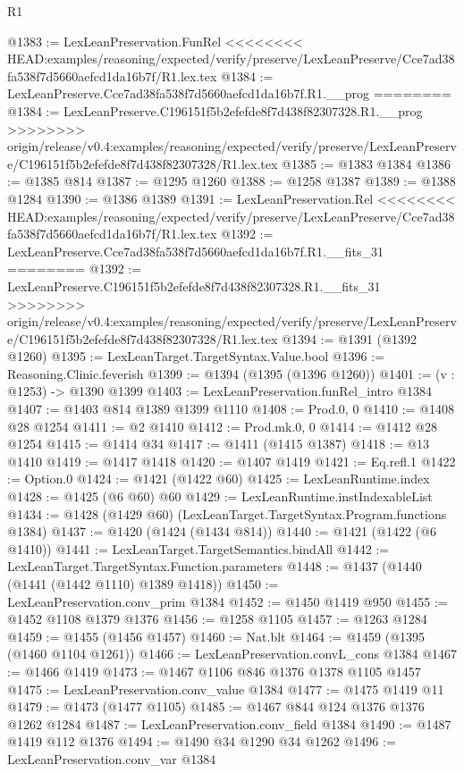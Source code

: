 \begin{lexlean}{R1}
\begin{coremodule}
{{{{{{{{{{{{{{{{{{{{{{{{{{{{{{{{{{{{{{{{{{{{{{{{{{{{{{{{{{{{{{{{{{{{{{{{{{{{{{{{{{{{{{{{{{@1383 := LexLeanPreservation.FunRel
<<<<<<<< HEAD:examples/reasoning/expected/verify/preserve/LexLeanPreserve/Cce7ad38fa538f7d5660aefcd1da16b7f/R1.lex.tex
@1384 := LexLeanPreserve.Cce7ad38fa538f7d5660aefcd1da16b7f.R1.__prog
========
@1384 := LexLeanPreserve.C196151f5b2efefde8f7d438f82307328.R1.__prog
>>>>>>>> origin/release/v0.4:examples/reasoning/expected/verify/preserve/LexLeanPreserve/C196151f5b2efefde8f7d438f82307328/R1.lex.tex
@1385 := @1383 @1384
@1386 := @1385 @814
@1387 := @1295 @1260
@1388 := @1258 @1387
@1389 := @1388 @1284
@1390 := @1386 @1389
@1391 := LexLeanPreservation.Rel
<<<<<<<< HEAD:examples/reasoning/expected/verify/preserve/LexLeanPreserve/Cce7ad38fa538f7d5660aefcd1da16b7f/R1.lex.tex
@1392 := LexLeanPreserve.Cce7ad38fa538f7d5660aefcd1da16b7f.R1.__fits_31
========
@1392 := LexLeanPreserve.C196151f5b2efefde8f7d438f82307328.R1.__fits_31
>>>>>>>> origin/release/v0.4:examples/reasoning/expected/verify/preserve/LexLeanPreserve/C196151f5b2efefde8f7d438f82307328/R1.lex.tex
@1394 := @1391 (@1392 @1260)
@1395 := LexLeanTarget.TargetSyntax.Value.bool
@1396 := Reasoning.Clinic.feverish
@1399 := @1394 (@1395 (@1396 @1260))
@1401 := (v : @1253) -> @1390 @1399
@1403 := LexLeanPreservation.funRel_intro @1384
@1407 := @1403 @814 @1389 @1399 @1110
@1408 := Prod.{0, 0}
@1410 := @1408 @28 @1254
@1411 := @2 @1410
@1412 := Prod.mk.{0, 0}
@1414 := @1412 @28 @1254
@1415 := @1414 @34
@1417 := @1411 (@1415 @1387)
@1418 := @13 @1410
@1419 := @1417 @1418
@1420 := @1407 @1419
@1421 := Eq.refl.{1}
@1422 := Option.{0}
@1424 := @1421 (@1422 @60)
@1425 := LexLeanRuntime.index
@1428 := @1425 (@6 @60) @60
@1429 := LexLeanRuntime.instIndexableList
@1434 := @1428 (@1429 @60) (LexLeanTarget.TargetSyntax.Program.functions @1384)
@1437 := @1420 (@1424 (@1434 @814))
@1440 := @1421 (@1422 (@6 @1410))
@1441 := LexLeanTarget.TargetSemantics.bindAll
@1442 := LexLeanTarget.TargetSyntax.Function.parameters
@1448 := @1437 (@1440 (@1441 (@1442 @1110) @1389 @1418))
@1450 := LexLeanPreservation.conv_prim @1384
@1452 := @1450 @1419 @950
@1455 := @1452 @1108 @1379 @1376
@1456 := @1258 @1105
@1457 := @1263 @1284
@1459 := @1455 (@1456 @1457)
@1460 := Nat.blt
@1464 := @1459 (@1395 (@1460 @1104 @1261))
@1466 := LexLeanPreservation.convL_cons @1384
@1467 := @1466 @1419
@1473 := @1467 @1106 @846 @1376 @1378 @1105 @1457
@1475 := LexLeanPreservation.conv_value @1384
@1477 := @1475 @1419 @11
@1479 := @1473 (@1477 @1105)
@1485 := @1467 @844 @124 @1376 @1376 @1262 @1284
@1487 := LexLeanPreservation.conv_field @1384
@1490 := @1487 @1419 @112 @1376
@1494 := @1490 @34 @1290 @34 @1262
@1496 := LexLeanPreservation.conv_var @1384
}}}}}}}}}}}}}}}}}}}}}}}}}}}}}}}}}}}}}}}}}}}}}}}}}}}}}}}}}}}}}}}}}}}}}}}}}}}}}}}}}}}}}}}}}}
\end{coremodule}
\end{lexlean}
